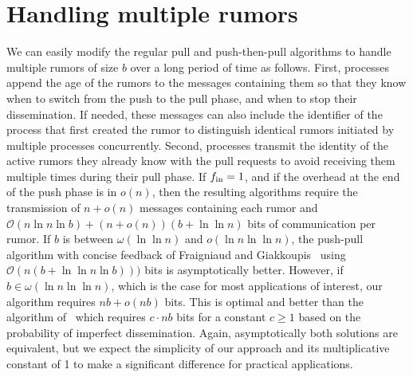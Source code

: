 \section{Handling multiple rumors}
\label{sec:multiplerumors}

We can easily modify the regular pull and push-then-pull algorithms to handle multiple rumors of size $b$ over a long period of time as follows. First, processes append the age of the rumors to the messages containing them so that they know when to switch from the push to the pull phase, and when to stop their dissemination. If needed, these messages can also include the identifier of the process that first created the rumor to distinguish identical rumors initiated by multiple processes concurrently. Second, processes transmit the identity of the active rumors they already know with the pull requests to avoid receiving them multiple times during their pull phase. If $f_\text{in}=1$, and if the overhead at the end of the push phase is in $o(n)$, then the resulting algorithms require the transmission of $n+o(n)$ messages containing each rumor and $\mathcal{O}(n \ln n \ln b) + (n+o(n)) (b + \ln \ln n)$ bits of communication per rumor. If $b$ is between $\omega(\ln \ln n)$ and $o(\ln n \ln \ln n)$, the push-pull algorithm with concise feedback of Fraigniaud and Giakkoupis~\cite{DBLP:conf/spaa/FraigniaudG10} using $\mathcal{O}(n (b + \ln \ln n \ln b ) ))$ bits is asymptotically better. However, if $b \in \omega(\ln n \ln \ln n)$, which is the case for most applications of interest, our algorithm requires $nb + o(nb)$ bits. This is optimal and better than the algorithm of~\cite{DBLP:conf/spaa/FraigniaudG10} which requires $c \cdot nb$ bits for a constant $c \geq 1$ based on the probability of imperfect dissemination. Again, asymptotically both solutions are equivalent, but we expect the simplicity of our approach and its multiplicative constant of 1 to make a significant difference for practical applications.

